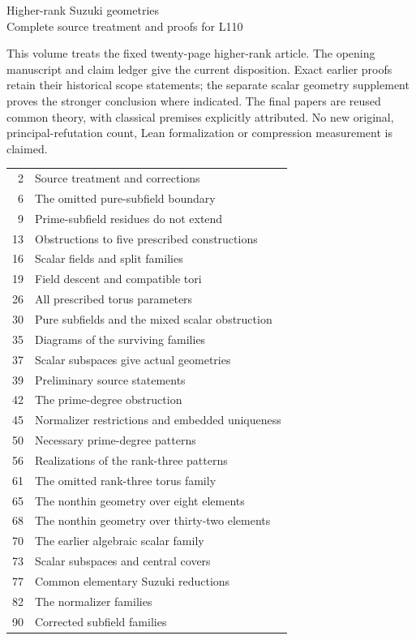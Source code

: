 \documentclass[11pt,a4paper]{article}
\begin{document}
\begin{center}{\Large Higher-rank Suzuki geometries}\\[4mm]
{\large Complete source treatment and proofs for L110}\end{center}
This volume treats the fixed twenty-page higher-rank article. The opening
manuscript and claim ledger give the current disposition. Exact earlier
proofs retain their historical scope statements; the separate scalar
geometry supplement proves the stronger conclusion where indicated.
The final papers are reused common theory, with classical premises
explicitly attributed. No new original, principal-refutation count,
Lean formalization or compression measurement is claimed.\par\medskip
\begin{tabular}{rl}
2 & Source treatment and corrections\\
6 & The omitted pure-subfield boundary\\
9 & Prime-subfield residues do not extend\\
13 & Obstructions to five prescribed constructions\\
16 & Scalar fields and split families\\
19 & Field descent and compatible tori\\
26 & All prescribed torus parameters\\
30 & Pure subfields and the mixed scalar obstruction\\
35 & Diagrams of the surviving families\\
37 & Scalar subspaces give actual geometries\\
39 & Preliminary source statements\\
42 & The prime-degree obstruction\\
45 & Normalizer restrictions and embedded uniqueness\\
50 & Necessary prime-degree patterns\\
56 & Realizations of the rank-three patterns\\
61 & The omitted rank-three torus family\\
65 & The nonthin geometry over eight elements\\
68 & The nonthin geometry over thirty-two elements\\
70 & The earlier algebraic scalar family\\
73 & Scalar subspaces and central covers\\
77 & Common elementary Suzuki reductions\\
82 & The normalizer families\\
90 & Corrected subfield families\\
\end{tabular}\newpage
\end{document}
